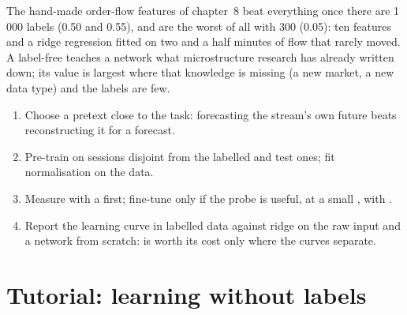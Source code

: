The hand-made order-flow features of chapter~8 beat everything once there are 1\,000 labels (0.50 and 0.55), and are the
worst of all with 300 (0.05): ten features and a ridge regression fitted on two and a half minutes of flow that rarely
moved. A label-free  teaches a network what microstructure research has already written down; its value is
largest where that knowledge is missing (a new market, a new data type) and the labels are few.

\begin{method}\label{met:ml:represent:method}
\begin{enumerate}
\item Choose a pretext close to the task: forecasting the stream's own future beats reconstructing it for a forecast.
\item Pre-train on sessions disjoint from the labelled and test ones; fit normalisation on the  data.
\item Measure with a  first; fine-tune only if the probe is useful, at a small , with .
\item Report the learning curve in labelled data against ridge on the raw input and a network from scratch: 
is worth its cost only where the curves separate.
\end{enumerate}
\end{method}

\section{Tutorial: learning without labels}\label{tut:ml:representation-learning:tut}

